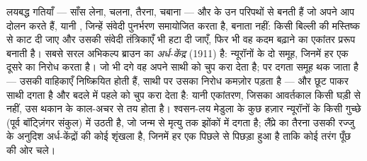\begin{proposition}[केंद्रीय प्ररूप-जनित्र]\label{prop:b3:nervous-systems:cpg}
लयबद्ध गतियाँ --- साँस लेना, चलना, तैरना, चबाना ---  और
 के उन परिपथों से बनती हैं जो अपने आप दोलन करते हैं, यानी
\emph{}, जिन्हें संवेदी पुनर्भरण समायोजित करता है,
बनाता नहीं: किसी बिल्ली की  मस्तिष्क से काट दी जाए और उसकी
संवेदी तंत्रिकाएँ भी हटा दी जाएँ, फिर भी वह कदम बढ़ाने का एकांतर प्ररूप
बनाती है। सबसे सरल अभिकल्प ब्राउन का \emph{अर्ध-केंद्र} (1911) है:
न्यूरॉनों के दो समूह, जिनमें हर एक दूसरे का निरोध करता है। जो भी दगे वह
अपने साथी को चुप करा देता है; पर दगता समूह थक जाता है --- उसकी
वाहिकाएँ निष्क्रियित होती हैं, साथी पर उसका निरोध कमज़ोर पड़ता है ---
और छूट पाकर साथी दगता है और बदले में पहले को चुप करा देता है: यानी
एकांतरण, जिसका आवर्तकाल किसी घड़ी से नहीं, उस थकान के काल-अचर से तय
होता है। श्वसन-लय मेडुला के कुछ हज़ार न्यूरॉनों के किसी गुच्छे (पूर्व
बॉट्ज़िंगर संकुल) में उठती है, जो जन्म से मृत्यु तक झोंकों में दगता है;
लैंप्रे का तैरना उसकी रज्जु के अनुदिश अर्ध-केंद्रों की कोई शृंखला है,
जिनमें हर एक पिछले से पिछड़ा हुआ है ताकि कोई तरंग पूँछ की ओर चले।
\end{proposition}

